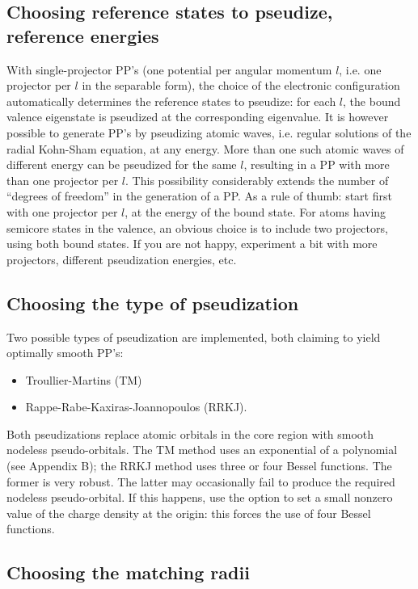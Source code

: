 \subsection{Choosing reference states to pseudize, reference energies}

With single-projector PP's (one potential per angular momentum $l$, 
i.e. one projector per $l$ in the separable form), the choice of the 
electronic configuration automatically determines the reference states
to pseudize: for each $l$, the bound valence eigenstate is pseudized
at the corresponding eigenvalue.
It is however possible to generate PP's by pseudizing atomic waves,
i.e. regular solutions of the radial Kohn-Sham equation, at any
energy. More than one such atomic waves of different energy can be
pseudized for the same $l$, resulting in a PP with more than one 
projector per $l$. 
This possibility considerably extends the number of ``degrees of 
freedom'' in the generation of a PP. As a rule of thumb: start first 
with one projector per $l$, at the energy of the bound state. For
atoms having semicore states in the valence, an obvious choice is 
to include two projectors, using both bound states. If you are not 
happy, experiment a bit with more projectors, different pseudization 
energies, etc.

\subsection{Choosing the type of pseudization}

Two possible types of pseudization are implemented, both claiming
to yield optimally smooth PP's:
\begin{itemize}
\item Troullier-Martins \cite{TM} (TM) 
\item Rappe-Rabe-Kaxiras-Joannopoulos \cite{RRKJ} (RRKJ).
\end{itemize}
Both pseudizations replace atomic orbitals in the core region 
with smooth nodeless pseudo-orbitals. The TM method uses an
exponential of a polynomial (see Appendix B); the RRKJ method 
uses three or four
Bessel functions. The former is very robust. The latter may 
occasionally fail to produce the required nodeless pseudo-orbital.
If this happens, use the option to set a small nonzero value of 
the charge density at the origin: this forces the use of four Bessel 
functions.

\subsection{Choosing the matching radii}

